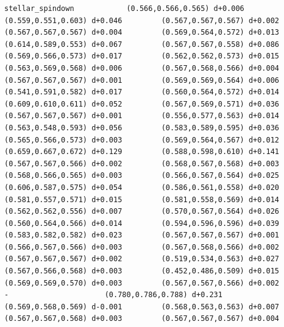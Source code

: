\documentclass[11pt, letterpaper, openany]{book}
\begin{document}
\begin{empiricalbox}
\begin{lstlisting}[style=terminal]
stellar_spindown            (0.566,0.566,0.565) d+0.006         (0.559,0.551,0.603) d+0.046         (0.567,0.567,0.567) d+0.002         (0.567,0.567,0.567) d+0.004         (0.569,0.564,0.572) d+0.013         (0.614,0.589,0.553) d+0.067         (0.567,0.567,0.558) d+0.086         (0.569,0.566,0.573) d+0.017         (0.562,0.562,0.573) d+0.015         (0.563,0.569,0.568) d+0.006         (0.567,0.568,0.566) d+0.004         (0.567,0.567,0.567) d+0.001         (0.569,0.569,0.564) d+0.006         (0.541,0.591,0.582) d+0.017         (0.560,0.564,0.572) d+0.014         (0.609,0.610,0.611) d+0.052         (0.567,0.569,0.571) d+0.036         (0.567,0.567,0.567) d+0.001         (0.556,0.577,0.563) d+0.014         (0.563,0.548,0.593) d+0.056         (0.583,0.589,0.595) d+0.036         (0.565,0.566,0.573) d+0.003         (0.569,0.564,0.567) d+0.012         (0.659,0.667,0.672) d+0.129         (0.588,0.598,0.610) d+0.141         (0.567,0.567,0.566) d+0.002         (0.568,0.567,0.568) d+0.003         (0.568,0.566,0.565) d+0.003         (0.566,0.567,0.564) d+0.025         (0.606,0.587,0.575) d+0.054         (0.586,0.561,0.558) d+0.020         (0.581,0.557,0.571) d+0.015         (0.581,0.558,0.569) d+0.014         (0.562,0.562,0.556) d+0.007         (0.570,0.567,0.564) d+0.026         (0.560,0.564,0.566) d+0.014         (0.594,0.596,0.596) d+0.039         (0.583,0.582,0.582) d+0.023         (0.567,0.567,0.567) d+0.001         (0.566,0.567,0.566) d+0.003         (0.567,0.568,0.566) d+0.002         (0.567,0.567,0.567) d+0.002         (0.519,0.534,0.563) d+0.027         (0.567,0.566,0.568) d+0.003         (0.452,0.486,0.509) d+0.015         (0.569,0.569,0.570) d+0.003         (0.567,0.567,0.566) d+0.002                      -                      (0.780,0.786,0.788) d+0.231         (0.569,0.568,0.569) d-0.001         (0.568,0.563,0.563) d+0.007         (0.567,0.567,0.568) d+0.003         (0.567,0.567,0.567) d+0.004     

\end{lstlisting}
\end{empiricalbox}
\end{document}
